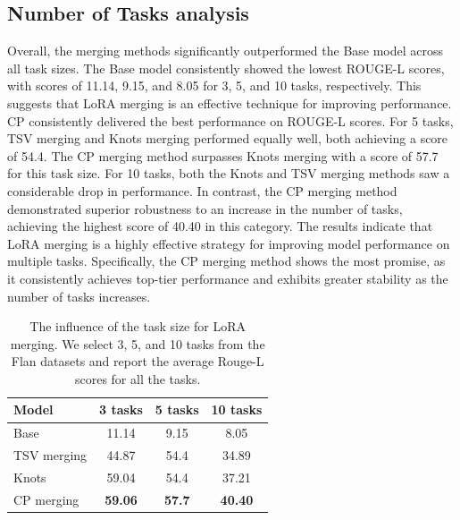 \documentclass[10pt]{article} %
\begin{document}


    


\subsection{Number of Tasks analysis}


Overall, the merging methods significantly outperformed the Base model across all task sizes. The Base model consistently showed the lowest ROUGE-L scores, with scores of 11.14, 9.15, and 8.05 for 3, 5, and 10 tasks, respectively. This suggests that LoRA merging is an effective technique for improving performance. 
CP consistently delivered the best performance on ROUGE-L scores. For 5 tasks, TSV merging and Knots merging performed equally well, both achieving a score of 54.4. The CP merging method surpasses Knots merging with a score of 57.7 for this task size. For 10 tasks, both the Knots and TSV merging methods saw a considerable drop in performance. In contrast, the CP merging method demonstrated superior robustness to an increase in the number of tasks, achieving the highest score of 40.40 in this category. The results indicate that LoRA merging is a highly effective strategy for improving model performance on multiple tasks. Specifically, the CP merging method shows the most promise, as it consistently achieves top-tier performance and exhibits greater stability as the number of tasks increases. 
\begin{table}[h]
    \centering
    \begin{tabular}{l|ccc}
    \toprule
      Model  & 3 tasks & 5 tasks & 10 tasks \\
    \midrule
     Base    & 11.14 & 9.15 & 8.05\\
     TSV merging & 44.87 & 54.4 & 34.89\\
     Knots & 59.04 & 54.4& 37.21\\
     \midrule
     CP merging & \textbf{59.06} & \textbf{57.7} & \textbf{40.40}\\
     \bottomrule
    \end{tabular}
    \caption{The influence of the task size for LoRA merging. We select 3, 5, and 10 tasks from the Flan datasets and report the average Rouge-L scores for all the tasks.}
    \label{tab:tasks_size}
\end{table}
\end{document}
